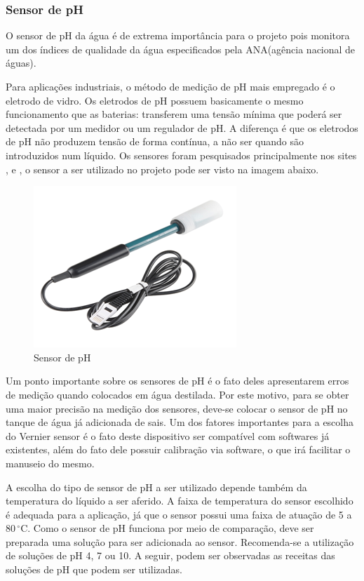 \subsubsection{Sensor de pH}
O sensor de pH da água é de extrema importância para o projeto  pois monitora um dos índices de qualidade da água especificados pela ANA(agência nacional de águas). 

Para aplicações industriais, o método de medição de pH mais empregado é o eletrodo de vidro. Os eletrodos de pH possuem basicamente o mesmo funcionamento que as baterias: transferem uma tensão mínima que poderá ser detectada por um medidor ou um regulador de pH. A diferença é que os eletrodos de pH não produzem tensão de forma contínua, a não ser quando são introduzidos num líquido. Os sensores foram pesquisados principalmente nos sites \footnotemark {}, \footnotemark {} e \footnotemark {}, o sensor a ser utilizado no projeto pode ser visto na imagem abaixo. 
	\begin{figure}[!htbp]
	  \centering
	  \includegraphics[scale=1]{editaveis/figuras/sensor_ph}
	  \caption[Sensor de pH]{Sensor de pH}
	  \label{sensor_ph}
	\end{figure}
	\FloatBarrier
Um ponto importante sobre os sensores de pH é o fato deles apresentarem erros de medição quando colocados em água destilada. Por este motivo, para se obter uma maior precisão na medição dos sensores, deve-se colocar o sensor de pH no tanque de água já adicionada de sais. Um dos fatores importantes para a escolha do Vernier sensor é o fato deste dispositivo ser compatível com softwares já existentes, além do fato dele possuir calibração via software, o que irá facilitar o manuseio do mesmo.

	A escolha do tipo de sensor de pH a ser utilizado depende também da temperatura do líquido a ser aferido. A faixa de temperatura do sensor escolhido é adequada para a aplicação, já que o sensor possui uma faixa de atuação de 5 a $80\,^{\circ}\mathrm{C}$. Como o sensor de pH funciona por meio de comparação, deve ser preparada uma solução para ser adicionada ao sensor. Recomenda-se a utilização de soluções de pH 4, 7 ou 10. A seguir, podem ser observadas as receitas das soluções de pH que podem ser utilizadas.

